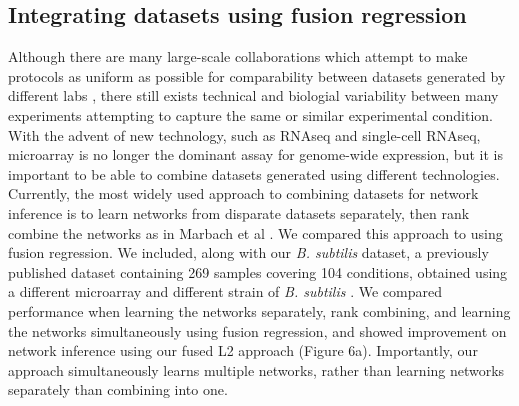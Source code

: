 \documentclass[11pt]{article}
\begin{document}
\subsection{Integrating datasets using fusion regression}
Although there are many large-scale collaborations which attempt to make protocols as uniform as possible for comparability between datasets generated by different labs \cite{kundaje_integrative_2015}, there still exists technical and biologial variability between many experiments attempting to capture the same or similar experimental condition. With the advent of new technology, such as RNAseq and single-cell RNAseq, microarray is no longer the dominant assay for genome-wide expression, but it is important to be able to combine datasets generated using different technologies. Currently, the most widely used approach to combining datasets for network inference is to learn networks from disparate datasets separately, then rank combine the networks as in Marbach et al \cite{marbach_revealing_2010}. We compared this approach to using fusion regression. We included, along with our \textit{B. subtilis} dataset, a previously published dataset containing 269 samples covering 104 conditions, obtained using a different microarray and different strain of \textit{B. subtilis} \cite{nicolas2012condition}. We compared performance when learning the networks separately, rank combining, and learning the networks simultaneously using fusion regression, and showed improvement on network inference using our fused L2 approach (Figure 6a). Importantly, our approach simultaneously learns multiple networks, rather than learning networks separately than combining into one. 
\end{document}
